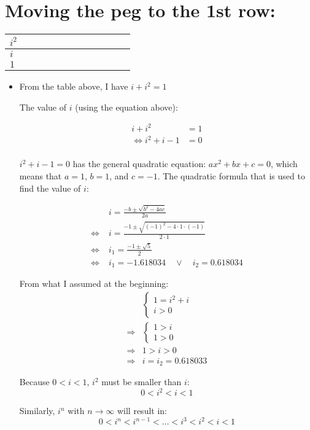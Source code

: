 \documentclass[12pt]{article}
\begin{document}
\section{Moving the peg to the 1st row:}
\begin{tabular}{|l|c|c|c|c|c|c|c|c|c|c|r|}
    \hline
    $i^2$ \\
    \hline
    $i$ \\
    \hline
    $1$ \\
    \hline
\end{tabular}

\begin{itemize}
    \item From the table above, I have $i+i^2=1$
    
    The value of $i$ (using the equation above): \par
    
    \begin{align*}
        i+i^2&=1\\
        \Longleftrightarrow
        i^2+i-1&=0\\
    \end{align*}

    $i^2+i-1=0$ has the general quadratic equation: $ax^2+bx+c=0$, which means that $a=1$, $b=1$, and $c=-1$. The quadratic formula that is used to find the value of $i$:

    \begin{align*}
        & i = \frac{-b\pm \sqrt{b^2-4ac}}{2a} \\
        \Longleftrightarrow\;
        & i = \frac{-1\pm \sqrt{\left(-1\right)^2 -4\cdot 1 \cdot (-1)}}{2\cdot 1}\\
        \Longleftrightarrow\;
        & i_1 = \frac{-1\pm\sqrt{5}}{2}\\
        \Longleftrightarrow\;
        & i_1 = -1.618034
        \quad \lor\quad i_2 = 0.618034
    \end{align*}


    From what I assumed at the beginning:
    \begin{align*}
        &
        \begin{cases}
            1=i^2+i \\
            i>0
        \end{cases}\\
        \Longrightarrow &
        \begin{cases}
            1>i\\
            1>0
        \end{cases}\\
        \Longrightarrow & 1>i>0\\
        \Longrightarrow & i= i_2=0.618033
    \end{align*}

    Because $0<i<1$, $i^2$ must be smaller than $i$:
    $$0<i^2<i<1$$

    Similarly, $i^n$ with $n\to \infty$ will result in:
    $$0<i^n<i^{n-1}<\dots<i^3<i^2<i<1$$
\end{itemize}
\end{document}
